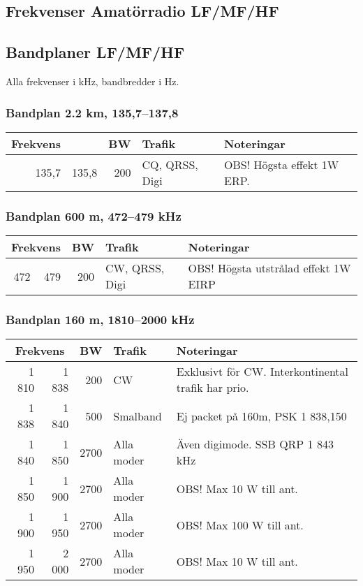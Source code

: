 \begin{landscape}
\section{Frekvenser Amatörradio LF/MF/HF}
\subsection{Bandplaner LF/MF/HF}
Alla frekvenser i kHz, bandbredder i Hz.

\subsubsection{Bandplan 2.2 km, 135,7--137,8}
\begin{tabular}{rrrll}
\textbf{Frekvens} &  & \textbf{BW} & \textbf{Trafik} & \textbf{Noteringar} \\ \hline
135,7 & 135,8 & 200 & CQ, QRSS, Digi & OBS! Högsta effekt 1W ERP. \\ \hline
\end{tabular}

\subsubsection{Bandplan 600 m, 472--479 kHz}
\begin{tabular}{rrrll}
\multicolumn{2}{c}{\textbf{Frekvens}} & \textbf{BW} & \textbf{Trafik} & \textbf{Noteringar} \\ \hline
472 & 479 & 200 & CW, QRSS, Digi & OBS! Högsta utstrålad effekt 1W EIRP \\ \hline
\end{tabular}

\subsubsection{Bandplan 160 m, 1810--2000 kHz}
\begin{tabular}{rrrll}
\multicolumn{2}{c}{\textbf{Frekvens}} & \textbf{BW} & \textbf{Trafik} & \textbf{Noteringar} \\ \hline
1 810 & 1 838 & 200  & CW         & Exklusivt för CW. Interkontinental trafik har prio. \\ \hline
1 838 & 1 840 & 500  & Smalband   & Ej packet på 160m, PSK 1 838,150                    \\ \hline
1 840 & 1 850 & 2700 & Alla moder & Även digimode. SSB QRP 1 843 kHz                    \\ \hline
1 850 & 1 900 & 2700 & Alla moder & OBS! Max 10 W till ant.                             \\ \hline
1 900 & 1 950 & 2700 & Alla moder & OBS! Max 100 W till ant.                            \\ \hline
1 950 & 2 000 & 2700 & Alla moder & OBS! Max 10 W till ant.                             \\ \hline
\end{tabular}


\end{landscape}

